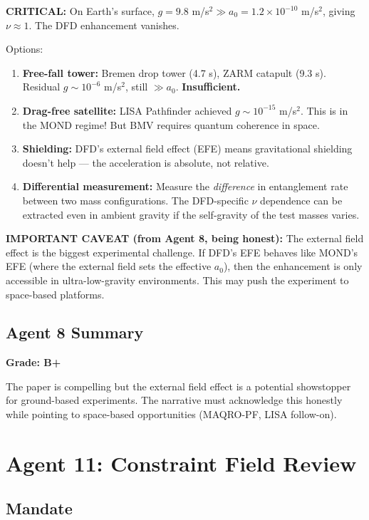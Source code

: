 \documentclass[11pt,a4paper]{article}
\begin{document}
\textbf{CRITICAL:} On Earth's surface, $g = 9.8$ m/s$^2 \gg a_0 = 1.2\times10^{-10}$ m/s$^2$, giving $\nu \approx 1$. The DFD enhancement vanishes.

Options:
\begin{enumerate}
\item \textbf{Free-fall tower:} Bremen drop tower (4.7 s), ZARM catapult (9.3 s). Residual $g \sim 10^{-6}$ m/s$^2$, still $\gg a_0$. \textbf{Insufficient.}
\item \textbf{Drag-free satellite:} LISA Pathfinder achieved $g \sim 10^{-15}$ m/s$^2$. This is in the MOND regime! But BMV requires quantum coherence in space.
\item \textbf{Shielding:} DFD's external field effect (EFE) means gravitational shielding doesn't help --- the acceleration is absolute, not relative.
\item \textbf{Differential measurement:} Measure the \emph{difference} in entanglement rate between two mass configurations. The DFD-specific $\nu$ dependence can be extracted even in ambient gravity if the self-gravity of the test masses varies.
\end{enumerate}

\textbf{IMPORTANT CAVEAT (from Agent 8, being honest):} The external field effect is the biggest experimental challenge. If DFD's EFE behaves like MOND's EFE (where the external field sets the effective $a_0$), then the enhancement is only accessible in ultra-low-gravity environments. This may push the experiment to space-based platforms.

\subsection{Agent 8 Summary}

\textbf{Grade: B+}

The paper is compelling but the external field effect is a potential showstopper for ground-based experiments. The narrative must acknowledge this honestly while pointing to space-based opportunities (MAQRO-PF, LISA follow-on).

\section{Agent 11: Constraint Field Review}
\label{sec:agent11}

\subsection{Mandate}
\end{document}
